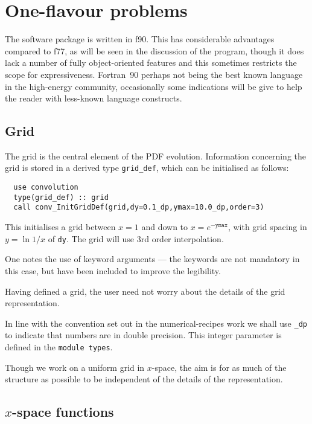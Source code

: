 \documentclass[12pt]{article}
\begin{document}
\section{One-flavour problems}

The software package is written in f90. This has considerable
advantages compared to f77, as will be seen in the discussion of the
program, though it does lack a number of fully object-oriented
features and this sometimes restricts the scope for expressiveness.
Fortran~90 perhaps not being the best known language in the
high-energy community, occasionally some indications will be give to
help the reader with less-known language constructs.


\subsection{Grid}
\label{sec:grid}

The grid is the central element of the PDF evolution. Information
concerning the grid is stored in a derived type \texttt{grid\_def},
which can be initialised as follows:
\begin{verbatim}
  use convolution
  type(grid_def) :: grid
  call conv_InitGridDef(grid,dy=0.1_dp,ymax=10.0_dp,order=3)
\end{verbatim}
This initialises a grid between $x=1$ and down to $x =
e^{-\texttt{ymax}}$, with grid spacing in $y = \ln 1/x$ of
\texttt{dy}. The grid will use 3rd order interpolation.

One notes the use of keyword arguments --- the keywords are not
mandatory in this case, but have been included to improve the
legibility. 

Having defined a grid, the user need not worry about the details of
the grid representation.

In line with the convention set out in the numerical-recipes work we
shall use \texttt{\_dp} to indicate that numbers are in double
precision. This integer parameter is defined in the \texttt{module
  types}.



Though we work on a uniform grid in $x$-space, the aim is for as much
of the structure as possible to be independent of the details of the
representation.

\subsection{$x$-space functions}
\label{sec:xspc}
\end{document}
